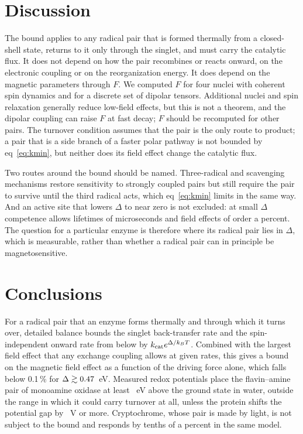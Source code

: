 \documentclass[journal=jpcbfk,manuscript=article,layout=traditional]{achemso}
\begin{document}
\section{Discussion}

The bound applies to any radical pair that is formed thermally from a
closed-shell state, returns to it only through the singlet, and must carry the
catalytic flux. It does not depend on how the pair recombines or reacts onward,
on the electronic coupling or on the reorganization energy. It does depend on
the magnetic parameters through $F$. We computed $F$ for four nuclei with
coherent spin dynamics and for a discrete set of dipolar tensors. Additional
nuclei and spin relaxation generally reduce low-field effects, but this is not a
theorem, and the dipolar coupling can raise $F$ at fast decay; $F$ should be
recomputed for other pairs. The turnover condition assumes that the pair is the
only route to product; a pair that is a side branch of a faster polar pathway
is not bounded by eq~\ref{eq:kmin}, but neither does its field effect change
the catalytic flux.

Two routes around the bound should be named. Three-radical and scavenging
mechanisms\cite{Kattnig2017} restore sensitivity to strongly coupled pairs but
still require the pair to survive until the third radical acts, which
eq~\ref{eq:kmin} limits in the same way. And an active site that lowers
$\Delta$ to near zero is not excluded: at small $\Delta$ competence allows
lifetimes of microseconds and field effects of order a percent. The question for
a particular enzyme is therefore where its radical pair lies in $\Delta$, which
is measurable, rather than whether a radical pair can in principle be
magnetosensitive.

\section{Conclusions}

For a radical pair that an enzyme forms thermally and through which it turns
over, detailed balance bounds the singlet back-transfer rate and the
spin-independent onward rate from below by $k_{\rm cat}e^{\Delta/k_BT}$.
Combined with the largest field effect that any exchange coupling allows at
given rates, this gives a bound on the magnetic field effect as a function of
the driving force alone, which falls below 0.1\,\% for
$\Delta\gtrsim0.47$~eV. Measured redox potentials place the
flavin--amine pair of monoamine oxidase at least \DeltaLit~eV above the ground
state in water, outside the range in which it could carry turnover at all,
unless the protein shifts the potential gap by \DeltaGap~V or more.
Cryptochrome, whose pair is made by light, is not subject to the bound and
responds by tenths of a percent in the same model.
\end{document}
